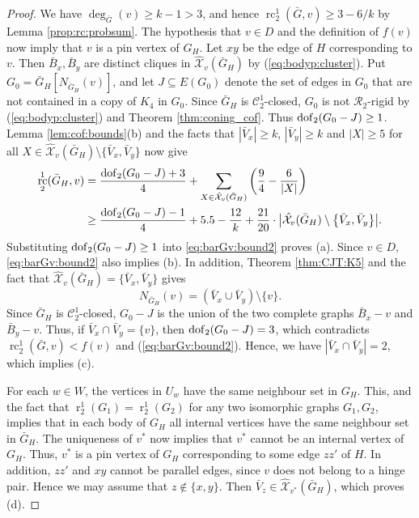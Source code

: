 \documentclass[11pt,a4paper]{article}
\theoremstyle{definition}
\DeclareMathOperator{\rr}{r}
\DeclareMathOperator{\rc}{rc}
\newcommand{\cR}{\mathcal{R}}
\newcommand{\dof}{{\rm dof}}
\newcommand{\hXX}{\hat{\mathcal{X}}}
\newcommand{\cC}{\mathcal{C}}
\begin{document}
\begin{proof} We have $\deg_{\bar G}(v)\geq k-1>3$, and hence $\rc_2^1(\bar G,v)\geq 3-6/k$ by Lemma \ref{prop:rc:probsum}. The hypothesis that  $v\in D$ and the definition of $f(v)$ now imply that $v$ is a pin vertex of $G_H$. Let $xy$ be the edge of $H$ corresponding to $v$. Then  $\bar B_x,\bar B_y$ are distinct cliques in $\hXX_v(\bar G_H)$ by (\ref{eq:bodyp:cluster}). Put $G_0=\bar G_H[N_{\bar G_H}(v)]$, and let $J\subseteq E(G_0)$ denote the set of edges in $G_0$ that are not contained in a copy of $K_4$ in $G_0$.  
Since $\bar G_H$ is $\cC_2^1$-closed, $G_0$ is not $\cR_2$-rigid by (\ref{eq:bodyp:cluster}) and Theorem \ref{thm:coning_cof}. Thus $\dof_2(G_0-J)\geq 1$.
Lemma \ref{lem:cof:bounds}(b) and the facts that $|\bar V_x|\geq k$, $|\bar V_y|\geq k$ and $|X|\geq 5$ for all  $X\in \hXX_v(\bar G_H)\setminus\{\bar V_x, \bar V_y\}$ now give 
\begin{align}\label{eq:barGv:bound}
\rc_2^1(\bar G_H,v)&= \frac{\dof_2(G_0-J)+3}{4}
+\sum_{X\in \hXX_v(\bar G_H)}\bigg(\frac{9}{4}-\frac{6}{|X|}\bigg)\\
&\geq \frac{\dof_2(G_0-J)-1}{4}+ 5.5-\frac{12}{k}+\frac{21}{20}\cdot \big|\hXX_v(\bar G_H)\setminus\big\{\bar V_x, \bar V_y\big\}\big|.\label{eq:barGv:bound2}
\end{align}
Substituting $\dof_2(G_0-J)\geq 1$ into  \eqref{eq:barGv:bound2} proves (a). Since $v\in D$, \eqref{eq:barGv:bound2} 
also implies (b). In addition, Theorem \ref{thm:CJT:K5} 
and
the fact that $\hXX_v(\bar G_H)=\{\bar V_x,\bar V_y\}$ gives  $$N_{\bar G_H}(v)=(\bar V_x\cup \bar V_y)\setminus\{v\}.$$
Since $\bar G_H$ is $\cC_2^1$-closed, $G_0-J$ is the union of the two complete graphs $\bar B_x-v$ and $\bar B_y-v$. Thus, if $\bar V_x \cap  \bar V_y=\{v\}$, then $\dof_2(G_0-J)= 3$, which contradicts $\rc_2^1(\bar G,v)< f(v)$ and (\ref{eq:barGv:bound2}). Hence, we have $|\bar V_x \cap  \bar V_y|=2,$ which implies (c).

For each $w\in W$, the vertices in $U_{w}$ have the same neighbour set in $G_H$. This, and the fact that $\rr_2^1(G_1)=\rr_2^1(G_2)$ for any two isomorphic graphs $G_1,G_2$, implies  that in each body of $G_H$ all internal vertices have the same neighbour set in $\bar G_H$. The uniqueness of $v^*$ now implies that $v^*$ cannot be an internal vertex of $G_H$. 
Thus, $v^*$ is a pin vertex of $G_H$ corresponding to some edge $zz'$ of $H$. In addition, $zz'$ and $xy$ cannot be parallel edges, since $v$ does not belong to a hinge pair. Hence we may assume that $z\notin \{x,y\}$.
Then $\bar V_z\in \hXX_{v^*}(\bar G_H)$, which proves (d).
\end{proof}
\end{document}
